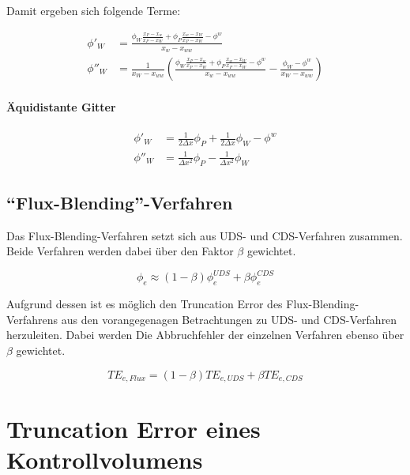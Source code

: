 \documentclass[11pt, ngerman,colorback,accentcolor=tud2d]{tudreport}
\begin{document}
Damit ergeben sich folgende Terme:

\begin{align}
  \phi'_W &= \frac{\phi_W \frac{x_P-x_w}{x_P-x_W} + \phi_P \frac{x_w-x_W}{x_P-x_W}
-\phi^w}{x_w-x_{ww}}\\
  \phi''_W &= \frac{1}{x_W-x_{ww}} \left({\frac{\phi_W \frac{x_P-x_w}{x_P-x_W} + \phi_P \frac{x_w-x_W}{x_P-x_W}
-\phi^w}{x_w-x_{ww}}
- \frac{\phi_W-\phi^w}{x_W-x_{ww}} }\right)
\end{align}


\paragraph{Äquidistante Gitter}

\begin{align*}
  \phi'_W  &= \frac{1}{2\Delta x} \phi_P + \frac{1}{2\Delta x} \phi_W - \phi^w\\
  \phi''_W &= \frac{1}{\Delta x^2} \phi_P -\frac{1}{\Delta x^2} \phi_W
\end{align*}


\subsection{``Flux-Blending''-Verfahren}

Das Flux-Blending-Verfahren setzt sich aus UDS- und CDS-Verfahren zusammen. Beide
Verfahren werden dabei über den Faktor $\beta$ gewichtet.

\begin{equation*}
\phi_e \approx (1-\beta)\phi_e^{UDS} + \beta \phi_e^{CDS} 
\end{equation*}

Aufgrund dessen ist es möglich den Truncation Error des Flux-Blending-Verfahrens aus
den vorangegenagen Betrachtungen zu UDS- und CDS-Verfahren herzuleiten.
Dabei werden Die Abbruchfehler der einzelnen Verfahren ebenso über $\beta$ gewichtet.

\begin{equation}
  TE_{e, Flux} = (1-\beta) TE_{e, UDS} + \beta TE_{e, CDS}
\end{equation}



\section{Truncation Error eines Kontrollvolumens}
\label{sec:Truncation Error eines Kontrollvolumens}
\end{document}
